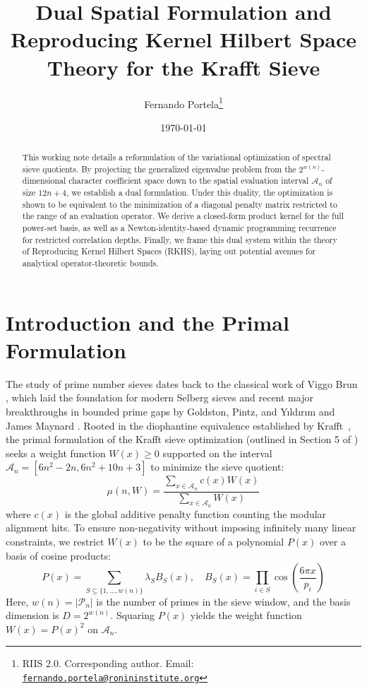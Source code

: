 \documentclass[10pt,twoside]{article}
\title{Dual Spatial Formulation and Reproducing Kernel Hilbert Space Theory for the Krafft Sieve}
\author{Fernando Portela\thanks{RIIS 2.0. Corresponding author. Email: \href{mailto:fernando.portela@ronininstitute.org}{\texttt{fernando.portela@ronininstitute.org}}}}
\date{\today}
\newcommand{\mathcalA}{\mathcal{A}}
\newcommand{\mathcalP}{\mathcal{P}}
\begin{document}
\maketitle

\begin{abstract}
This working note details a reformulation of the variational optimization of spectral sieve quotients. By projecting the generalized eigenvalue problem from the $2^{w(n)}$-dimensional character coefficient space down to the spatial evaluation interval $\mathcalA_n$ of size $12n+4$, we establish a dual formulation. Under this duality, the optimization is shown to be equivalent to the minimization of a diagonal penalty matrix restricted to the range of an evaluation operator. We derive a closed-form product kernel for the full power-set basis, as well as a Newton-identity-based dynamic programming recurrence for restricted correlation depths. Finally, we frame this dual system within the theory of Reproducing Kernel Hilbert Spaces (RKHS), laying out potential avenues for analytical operator-theoretic bounds.
\end{abstract}

\section{Introduction and the Primal Formulation} \label{sec:intro}

The study of prime number sieves dates back to the classical work of Viggo Brun \cite{Brun1919},
which laid the foundation for modern Selberg sieves \cite{Selberg1947} and recent major
breakthroughs in bounded prime gaps by Goldston, Pintz, and Y{\i}ld{\i}r{\i}m \cite{GPY2009} and
James Maynard \cite{Maynard2015}. Rooted in the diophantine equivalence established by
Krafft~\cite{Krafft1801}, the primal formulation of the Krafft sieve optimization (outlined
in Section 5 of \cite{Portela2026b}) seeks a weight function $W(x) \ge 0$ supported on the interval
$\mathcalA_n = [6n^2 - 2n, 6n^2 + 10n + 3]$ to minimize the sieve quotient:
\begin{equation}
\mu(n, W) = \frac{\sum_{x \in \mathcalA_n} c(x) W(x)}{\sum_{x \in \mathcalA_n} W(x)}
\end{equation}
where $c(x)$ is the global additive penalty function counting the modular alignment hits. To ensure non-negativity without imposing infinitely many linear constraints, we restrict $W(x)$ to be the square of a polynomial $P(x)$ over a basis of cosine products:
\begin{equation}
P(x) = \sum_{S \subseteq \{1, \dots, w(n)\}} \lambda_S B_S(x), \quad B_S(x) = \prod_{i \in S} \cos\left(\frac{6\pi x}{p_i}\right)
\end{equation}
Here, $w(n) = |\mathcalP_n|$ is the number of primes in the sieve window, and the basis dimension is $D = 2^{w(n)}$. Squaring $P(x)$ yields the weight function $W(x) = P(x)^2$ on $\mathcalA_n$.
\end{document}
